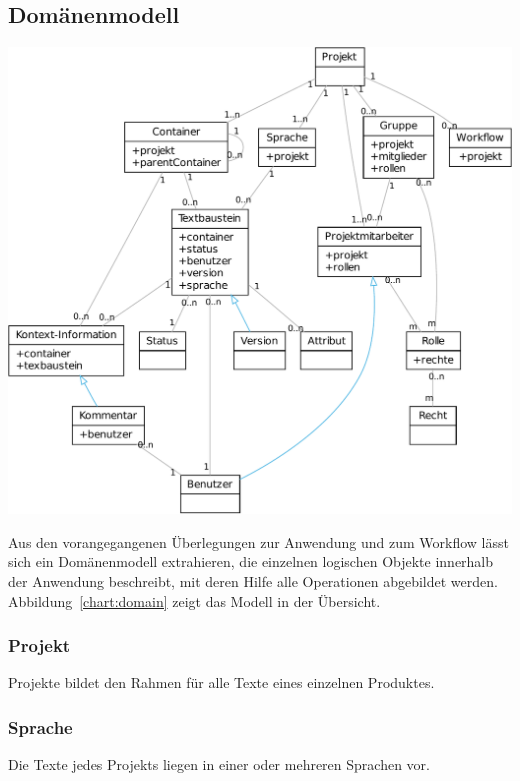 \subsection{Domänenmodell}\label{l:domänenmodell}

\begin{center}
\includegraphics[width=\textwidth]{media/domain.pdf}
\label{chart:domain}
\end{center}

Aus den vorangegangenen Überlegungen zur Anwendung und zum Workflow lässt sich ein Domänenmodell extrahieren, die einzelnen logischen Objekte innerhalb der Anwendung beschreibt, mit deren Hilfe alle Operationen abgebildet werden. Abbildung~\ref{chart:domain} zeigt das Modell in der Übersicht.

\subsubsection{Projekt}\label{model:projekt}

Projekte bildet den Rahmen für alle Texte eines einzelnen Produktes.

\subsubsection{Sprache}\label{model:sprache}

Die Texte jedes Projekts liegen in einer oder mehreren Sprachen vor.

